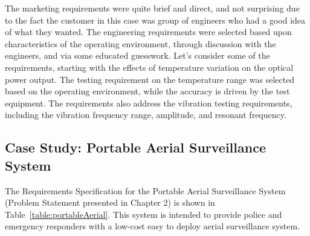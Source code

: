 The marketing requirements were quite brief and direct, and not
surprising due to the fact the customer in this case was group of
engineers who had a good idea of what they wanted. The engineering
requirements were selected based upon characteristics of the operating
environment, through discussion with the engineers, and via some
educated guesswork. Let's consider some of the requirements, starting
with the effects of temperature variation on the optical power output.
The testing requirement on the temperature range was selected based on
the operating environment, while the accuracy is driven by the test
equipment. The requirements also address the vibration testing
requirements, including the vibration frequency range, amplitude, and
resonant frequency.

\subsection{Case Study: Portable Aerial Surveillance System}
\label{subsection:case-study-portable-aerial-surveillance-system}

The Requirements Specification for the Portable Aerial Surveillance
System (Problem Statement presented in Chapter 2) is shown in Table~\ref{table:portableAerial}.
This system is intended to provide police and emergency responders with
a low-cost easy to deploy aerial surveillance system.

